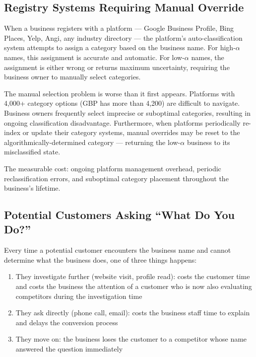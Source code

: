 \documentclass[12pt, openany]{book}
\theoremstyle{thmstyle}
\theoremstyle{defstyle}
\begin{document}
\subsection{Registry Systems Requiring Manual Override}

When a business registers with a platform --- Google Business Profile, Bing Places, Yelp, Angi, any industry directory --- the platform's auto-classification system attempts to assign a category based on the business name. For high-$\alpha$ names, this assignment is accurate and automatic. For low-$\alpha$ names, the assignment is either wrong or returns maximum uncertainty, requiring the business owner to manually select categories.

The manual selection problem is worse than it first appears. Platforms with 4,000+ category options (GBP has more than 4,200) are difficult to navigate. Business owners frequently select imprecise or suboptimal categories, resulting in ongoing classification disadvantage. Furthermore, when platforms periodically re-index or update their category systems, manual overrides may be reset to the algorithmically-determined category --- returning the low-$\alpha$ business to its misclassified state.

The measurable cost: ongoing platform management overhead, periodic reclassification errors, and suboptimal category placement throughout the business's lifetime.

\subsection{Potential Customers Asking ``What Do You Do?''}

Every time a potential customer encounters the business name and cannot determine what the business does, one of three things happens:
\begin{enumerate}[leftmargin=1.5em]
  \item They investigate further (website visit, profile read): costs the customer time and costs the business the attention of a customer who is now also evaluating competitors during the investigation time
  \item They ask directly (phone call, email): costs the business staff time to explain and delays the conversion process
  \item They move on: the business loses the customer to a competitor whose name answered the question immediately
\end{enumerate}
\end{document}
